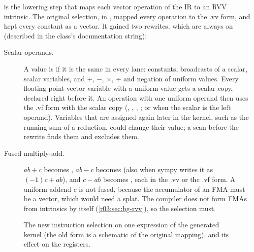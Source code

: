  is the lowering step that maps each vector operation of the IR to
an RVV intrinsic. The original selection,  in
, mapped every operation to the .vv form, and
kept every constant as a vector. It gained two rewrites, which are always on (described in the
class's documentation string):
\begin{description}
  \item[Scalar operands.] A value is  if it is the same in every lane: constants,
        broadcasts of a scalar, scalar variables, and $+$, $-$, $\times$, $\div$ and
        negation of uniform values. Every floating-point vector variable with a uniform value
        gets a scalar copy, declared right before it. An operation with one uniform operand then
        uses the .vf form with the scalar copy (, ,
        , ;  or  when the scalar
        is the left operand). Variables that are assigned again later in the kernel, such as
        the running sum of a reduction, could change their value; a scan before the rewrite
        finds them and excludes them.
  \item[Fused multiply-add.] $a b + c$ becomes , $a b - c$ becomes 
        (also when sympy writes it as $(-1) c + a b$), and $c - a b$ becomes ,
        each in the .vv or the .vf form. A uniform addend $c$ is not fused, because the
        accumulator of an FMA must be a vector, which would need a splat. The compiler does not
        form FMAs from intrinsics by itself (\cref{r03:sec:bg-rvv}), so the selection must.
\end{description}

\begin{figure}[htbp]
  \centering
  \resizebox{\linewidth}{!}{}
  \caption[The new instruction selection]{The new instruction selection on one expression of
    the generated kernel (the old form is a schematic of the original mapping), and its effect
    on the registers.}\label{r03:fig:selector}
\end{figure}

